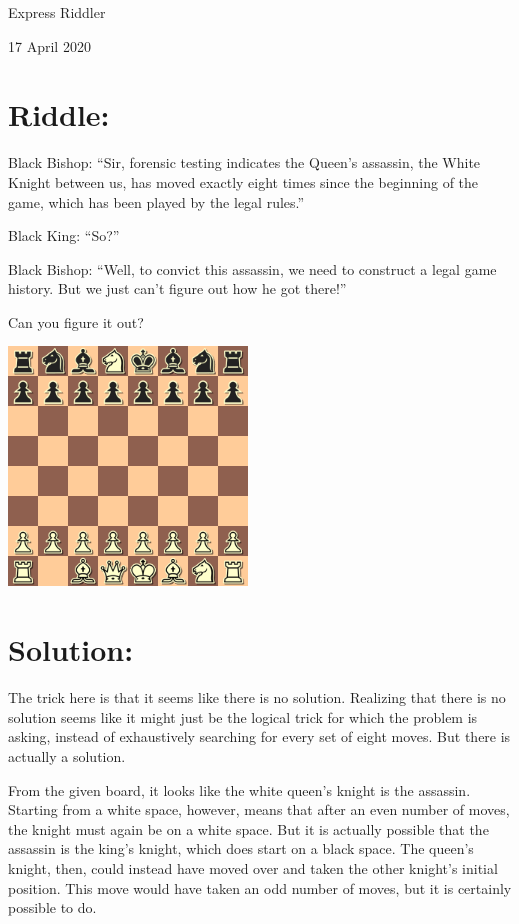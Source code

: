 \documentclass{article}
\begin{document}
\pagestyle{empty} %

\begin{center}
{\LARGE Express Riddler}

\vspace{0.15in}

{\Large 17 April 2020}
\end{center}


\section*{Riddle:}

Black Bishop: ``Sir, forensic testing indicates the Queen's assassin, the White Knight between us, has moved exactly eight times since the beginning of the game, which has been played by the legal rules.''

Black King: ``So?''

Black Bishop: ``Well, to convict this assassin, we need to construct a legal game history.
But we just can't figure out how he got there!''

Can you figure it out?

\begin{center}
\includegraphics[width=2.5in]{chess.png}
\end{center}

\section*{Solution:}

The trick here is that it seems like there is no solution.
Realizing that there is no solution seems like it might just be the logical trick for which the problem is asking, instead of exhaustively searching for every set of eight moves.
But there is actually a solution.

From the given board, it looks like the white queen's knight is the assassin.
Starting from a white space, however, means that after an even number of moves, the knight must again be on a white space.
But it is actually possible that the assassin is the king's knight, which does start on a black space.
The queen's knight, then, could instead have moved over and taken the other knight's initial position.
This move would have taken an odd number of moves, but it is certainly possible to do.
\end{document}
